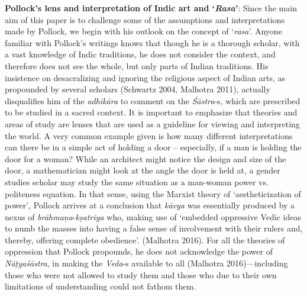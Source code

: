 \textbf{Pollock’s lens and interpretation of Indic art and ‘\textsl{Rasa}'}: Since the main aim of this paper is to challenge some of the assumptions and interpretations made by Pollock, we begin with his outlook on the concept of ‘\textsl{rasa}'. Anyone familiar with Pollock’s writings knows that though he is a thorough scholar, with a vast knowledge of Indic traditions, he does not consider the context, and therefore does not see the whole, but only parts of Indian traditions. His insistence on desacralizing and ignoring the religious aspect of Indian arts, as propounded by several scholars (Schwartz 2004, Malhotra 2011), actually disqualifies him of the \textsl{adhikāra} to comment on the \textsl{Śāstra}-s, which are prescribed to be studied in a sacred context. It is important to emphasize that theories and areas of study are lenses that are used as a guideline for viewing and interpreting the world. A very common example given is how many different interpretations can there be in a simple act of holding a door -- especially, if a man is holding the door for a woman? While an architect might notice the design and size of the door, a mathematician might look at the angle the door is held at, a gender studies scholar may study the same situation as a man-woman power vs. politeness equation. In that sense, using the Marxist theory of ‘aestheticization of power’, Pollock arrives at a conclusion that \textsl{kāvya} was essentially produced by a nexus of \textsl{brāhmaṇa}-\textsl{kṣatriya} who, making use of ‘embedded oppressive Vedic ideas to numb the masses into having a false sense of involvement with their rulers and, thereby, offering complete obedience’. (Malhotra 2016). For all the theories of oppression that Pollock propounds, he does not acknowledge the power of \textsl{Nāṭyaśāstra}, in making the \textsl{Veda}-s available to all (Malhotra 2016)---including those who were not allowed to study them and those who due to their own limitations of understanding could not fathom them. 

